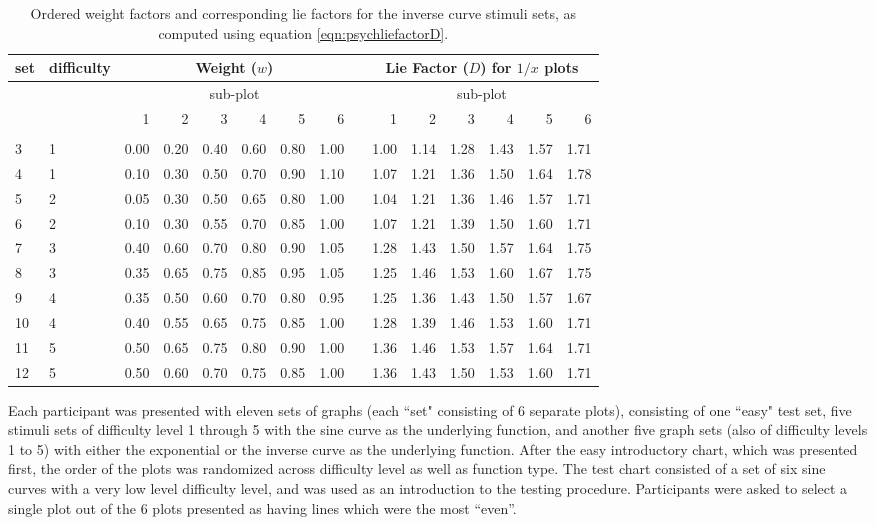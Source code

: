 \documentclass[11pt]{isuthesis}\usepackage[]{graphicx}\usepackage[]{color}
\begin{document}
\begin{table}[ht]
\centering
\caption{\label{tab:w3} Ordered weight factors and corresponding lie factors for the inverse curve stimuli sets, as computed using equation \ref{eqn:psychliefactorD}. 
}
     \begin{tabular}{llrrrrrrlrrrrrr}
     \hline
     set \vphantom{hp}& difficulty & \multicolumn{6}{c}{Weight ($w$)} & & \multicolumn{6}{c}{Lie Factor ($D$) for $1/x$ plots}\\ 
     \hline
     & & \multicolumn{6}{c}{sub-plot} & & \multicolumn{6}{c}{sub-plot}\\ 
     & & 1 & 2 & 3 & 4 & 5 & 6  & & 1 & 2 & 3 & 4 & 5 & 6  \\ 
     \cline{3-8} \cline{10-15}\\ [-1.75ex]
     3 & 1 & 0.00 & 0.20 & 0.40 & 0.60 & 0.80 & 1.00 &  & 1.00 & 1.14 & 1.28 & 1.43 & 1.57 & 1.71 \\ 
     4 & 1 & 0.10 & 0.30 & 0.50 & 0.70 & 0.90 & 1.10 &  & 1.07 & 1.21 & 1.36 & 1.50 & 1.64 & 1.78 \\ 
     5 & 2 & 0.05 & 0.30 & 0.50 & 0.65 & 0.80 & 1.00 &  & 1.04 & 1.21 & 1.36 & 1.46 & 1.57 & 1.71 \\ 
     6 & 2 & 0.10 & 0.30 & 0.55 & 0.70 & 0.85 & 1.00 &  & 1.07 & 1.21 & 1.39 & 1.50 & 1.60 & 1.71 \\ 
     7 & 3 & 0.40 & 0.60 & 0.70 & 0.80 & 0.90 & 1.05 &  & 1.28 & 1.43 & 1.50 & 1.57 & 1.64 & 1.75 \\ 
     8 & 3 & 0.35 & 0.65 & 0.75 & 0.85 & 0.95 & 1.05 &  & 1.25 & 1.46 & 1.53 & 1.60 & 1.67 & 1.75 \\ 
     9 & 4 & 0.35 & 0.50 & 0.60 & 0.70 & 0.80 & 0.95 &  & 1.25 & 1.36 & 1.43 & 1.50 & 1.57 & 1.67 \\ 
     10 & 4 & 0.40 & 0.55 & 0.65 & 0.75 & 0.85 & 1.00 &  & 1.28 & 1.39 & 1.46 & 1.53 & 1.60 & 1.71 \\ 
     11 & 5 & 0.50 & 0.65 & 0.75 & 0.80 & 0.90 & 1.00 &  & 1.36 & 1.46 & 1.53 & 1.57 & 1.64 & 1.71 \\ 
     12 & 5 & 0.50 & 0.60 & 0.70 & 0.75 & 0.85 & 1.00 &  & 1.36 & 1.43 & 1.50 & 1.53 & 1.60 & 1.71 \\ 
     \hline
     \end{tabular}
\end{table}

Each participant was presented with eleven sets of graphs (each ``set" consisting of 6 separate plots), consisting of one ``easy" test set, five stimuli sets of difficulty level 1 through 5 with the sine curve as the underlying function, and another five graph sets (also of difficulty levels 1 to 5) with either the exponential or the inverse curve as the underlying function. After the easy introductory chart, which was presented first, the order of the plots was randomized across difficulty level as well as function type. The test chart consisted of a set of six sine curves with a very low level difficulty level, and was used as an introduction to the testing procedure. Participants were asked to select a single plot out of the 6 plots presented as having lines which were the most ``even''. 
\end{document}
